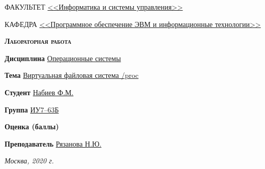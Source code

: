 \begin{titlepage}
    \begin{flushleft}
        \small
        ФАКУЛЬТЕТ \uline{<<Информатика и системы управления>> \hfill} \par
        \vspace{0.25cm}
        КАФЕДРА \uline{<<Программное обеспечение ЭВМ и информационные технологии>> \hfill} \par
    \end{flushleft}

    \vspace{4cm}

    {\LARGE\scshape\bfseries
        Лабораторная работа 
    }

    \vspace{2cm}

    \begin{flushleft}
        \large
        \begin{minipage}[t]{0.8\linewidth}
            \textbf{Дисциплина }\uline{\hfill Операционные системы \hfill} \par
            \vspace{0.25cm}
            \textbf{Тема }\uline{\hfill Виртуальная файловая система /proc \hfill} \par
        \end{minipage}

        \vspace{1cm}

        \begin{minipage}[t]{0.6\linewidth}
            \textbf{Студент }\uline{\hfill Набиев Ф.М. \hfill} \par
            \vspace{0.25cm}
            \textbf{Группа }\uline{\hfill ИУ7--63Б \hfill} \par
            \vspace{0.25cm}
            \textbf{Оценка (баллы) }\uline{\hfill \hfill} \par
            \vspace{0.25cm}
            \textbf{Преподаватель }\uline{\hfill Рязанова Н.Ю. \hfill} \par
        \end{minipage}

    \end{flushleft}

    \vfill

    \it
    Москва, 2020 г.

\end{titlepage}

